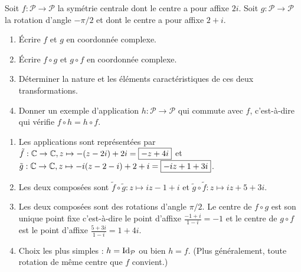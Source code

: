 \begin{exo}
Soit $f:\mathcal P\to\mathcal P$ la symétrie centrale dont le centre a pour affixe $2i$. Soit $g:\mathcal P\to\mathcal P$ la rotation d'angle $-\pi/2$ et dont le centre a pour affixe $2+i$.
\begin{enumerate}
\item Écrire $f$ et $g$ en coordonnée complexe.
\item Écrire $f\circ g$ et $g\circ f$ en coordonnée complexe.
\item Déterminer la nature et les éléments caractéristiques de ces deux transformations.
\item Donner un exemple d'application $h:\mathcal P\to \mathcal P$ qui commute avec $f$, c'est-à-dire qui vérifie $f\circ h=h\circ f$.
\end{enumerate}
\begin{sol}
\begin{enumerate}
\item Les applications sont représentées par $\tilde f : \mathbb{C}\to \mathbb{C}, z\mapsto -(z-2i)+2i=\boxed{-z+4i}$ et $\tilde g : \mathbb{C}\to \mathbb{C}, z\mapsto -i(z-2-i)+2+i=\boxed{-iz+1+3i}$.
\item Les deux composées sont $\tilde f \circ \tilde g : z\mapsto \boxed{iz-1+i}$ et $\tilde g\circ \tilde f : z\mapsto \boxed{iz+5+3i}$.
\item Les deux composées sont des rotations d'angle $\pi/2$. Le centre de $f\circ g$ est son unique point fixe c'est-à-dire le point d'affixe $\frac{-1+i}{1-i}=\boxed{-1}$ et le centre de $g\circ f$ est le point d'affixe $\frac{5+3i}{1-i}=\boxed{1+4i}$.
\item Choix les plus simples : $h=\operatorname{Id}_{\mathcal P}$ ou bien $h=f$. (Plus généralement, toute rotation de même centre que $f$ convient.)
\end{enumerate}
\end{sol}
\end{exo}


